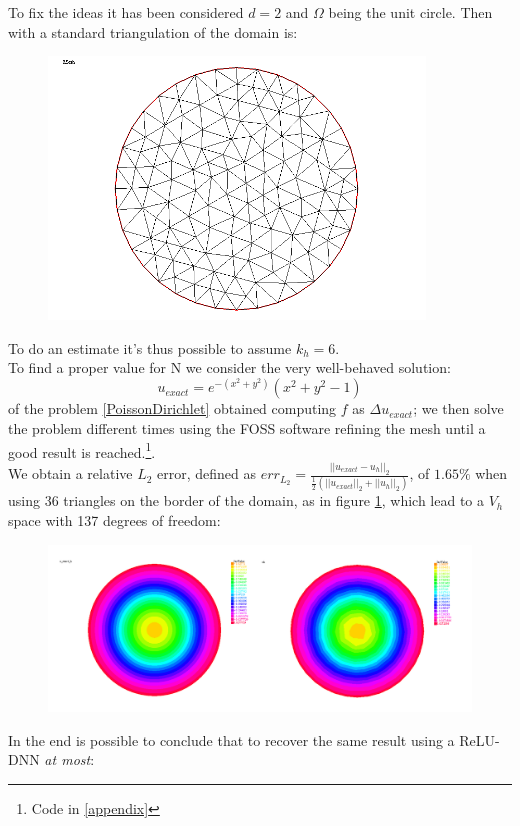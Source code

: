 \documentclass[12pt, a4paper]{report}
\theoremstyle{definition}
\begin{document}
{To fix the ideas it has been considered $d=2$ and $\Omega$ being the unit circle. Then with a standard triangulation of the domain is:
\begin{figure}[H]
	\centering
	\includegraphics[width=10cm]{img/triangulation.png}
	\caption{}\label{k_h}
\end{figure}
\noindent To do an estimate it's thus possible to assume $k_h=6$.\\
To find a proper value for N we consider the very well-behaved solution:
\[u_{exact}=e^{-(x^2+y^2)}(x^2+y^2-1)\]
of the problem \eqref{PoissonDirichlet} obtained computing $f$ as $\Delta u_{exact}$; we then solve the problem different times using the FOSS software \cite{freefem++} refining the mesh until a good result is reached.\footnote{Code in \ref{appendix}}. \\
We obtain a relative $L_2$ error, defined as $err_{L_2} = \frac{||u_{exact}-u_h||_2}{ \frac{1}{2} (||u_{exact}||_2+||u_h||_2) }  $, of $1.65\%$ when using 36 triangles on the border of the domain, as in figure \ref{k_h}, which lead to a $V_h$ space with 137 degrees of freedom:
\begin{figure}[H]
	\centering
	\includegraphics[width=14cm]{img/u2.png}
	\caption{}\label{u2}
\end{figure}
\noindent In the end is possible to conclude that to recover the same result using a ReLU-DNN \textit{at most}:
}
\end{document}
